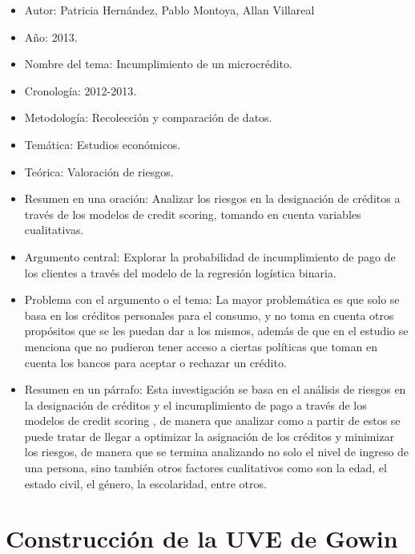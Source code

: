 \documentclass[
  letterpaper,
  DIV=11,
  numbers=noendperiod]{scrreprt}
\begin{document}
\begin{itemize}
\item
  Autor: Patricia Hernández, Pablo Montoya, Allan Villareal
\item
  Año: 2013.
\item
  Nombre del tema: Incumplimiento de un microcrédito.
\item
  Cronología: 2012-2013.
\item
  Metodología: Recolección y comparación de datos.
\item
  Temática: Estudios económicos.
\item
  Teórica: Valoración de riesgos.
\item
  Resumen en una oración: Analizar los riesgos en la designación de
  créditos a través de los modelos de credit scoring, tomando en cuenta
  variables cualitativas.
\item
  Argumento central: Explorar la probabilidad de incumplimiento de pago
  de los clientes a través del modelo de la regresión logística binaria.
\item
  Problema con el argumento o el tema: La mayor problemática es que solo
  se basa en los créditos personales para el consumo, y no toma en
  cuenta otros propósitos que se les puedan dar a los mismos, además de
  que en el estudio se menciona que no pudieron tener acceso a ciertas
  políticas que toman en cuenta los bancos para aceptar o rechazar un
  crédito.
\item
  Resumen en un párrafo: Esta investigación se basa en el análisis de
  riesgos en la designación de créditos y el incumplimiento de pago a
  través de los modelos de credit scoring , de manera que analizar como
  a partir de estos se puede tratar de llegar a optimizar la asignación
  de los créditos y minimizar los riesgos, de manera que se termina
  analizando no solo el nivel de ingreso de una persona, sino también
  otros factores cualitativos como son la edad, el estado civil, el
  género, la escolaridad, entre otros.
\end{itemize}

\section{Construcción de la UVE de
Gowin}\label{construcciuxf3n-de-la-uve-de-gowin}
\end{document}
